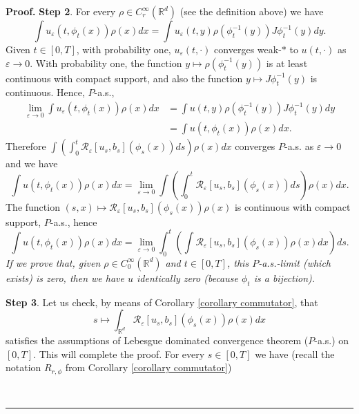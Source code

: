 \documentclass[a4paper,10pt]{article}
\newenvironment{proof}[1][Proof]{\textbf{#1.} }{\ \rule{0.5em}{0.5em}}
\begin{document}
\begin{proof}
\vskip 2mm \textbf{Step 2}. For every $\rho\in
C_{r}^{\infty}({}{\mathbb{R}}^{d})$ (see the definition above) we
have
\[
\int u_{{\varepsilon}}(t,{\phi}_{t}(x))\rho\left(  x\right)  dx=\int
u_{{\varepsilon}}(t,{y})\rho\left(  {\phi}_{t}^{-1}(y)\right)  J{\phi}%
_{t}^{-1}(y)dy.
\]
Given $t\in\left[  0,T\right]  $, with probability one, $u_{{\varepsilon}%
}(t,{\cdot})$ converges weak-$*$  to $u(t,{\cdot})$ as $\varepsilon
\rightarrow0$. With probability one, the function $y\mapsto\rho(  {\phi
}_{t}^{-1}(y))  $ is at least continuous with compact support, and also
the function $y\mapsto J{\phi}_{t}^{-1}(y)$ is continuous. Hence, $P$-a.s.,
\begin{align*}
\lim_{\varepsilon\rightarrow0}\int u_{{\varepsilon}}(t,{\phi}_{t}%
(x))\rho\left(  x\right)  dx  &  =\int u(t,{y})\rho\left(  {\phi}_{t}%
^{-1}(y)\right)  J{\phi}_{t}^{-1}(y)dy\\
&  =\int u(t,{\phi}_{t}(x))\rho\left(  x\right)  dx.
\end{align*}
Therefore $\int\left(  \int_{0}^{t}\mathcal{R}_{\varepsilon}\left[
u_{s},b_{s}\right]  \left(  {\phi}_{s}(x)\right)  ds\right)  \rho\left(
x\right)  dx$ converges $P$-a.s. as $\varepsilon\rightarrow0$ and we have
\[
\int u(t,{\phi}_{t}(x))\rho\left(  x\right)  dx=\lim_{\varepsilon\rightarrow
0}\int\left(  \int_{0}^{t}\mathcal{R}_{\varepsilon}\left[  u_{s},b_{s}\right]
\left(  {\phi}_{s}(x)\right)  ds\right)  \rho\left(  x\right)  dx.
\]
The function $\left(  s,x\right)  \mapsto\mathcal{R}_{\varepsilon}\left[
u_{s},b_{s}\right]  \left(  {\phi}_{s}(x)\right)  \rho\left(  x\right)  $ is
continuous with compact support, $P$-a.s., hence
\[
\int u(t,{\phi}_{t}(x))\rho\left(  x\right)  dx=\lim_{\varepsilon\rightarrow
0}\int_{0}^{t}\left(  \int\mathcal{R}_{\varepsilon}\left[  u_{s},b_{s}\right]
\left(  {\phi}_{s}(x)\right)  \rho\left(  x\right)  dx\right)  ds.
\]
{\it If we prove that, given $\rho\in
C_{0}^{\infty}({}{\mathbb{R}}^{d})$ and $t\in\left[  0,T\right] $,
this $P$-a.s.-limit (which exists) is zero, then we have $u$
identically zero (because ${\phi}_{t}$ is a bijection).
}

\vskip 2mm \textbf{Step 3}. Let us check, by means of Corollary
\ref{corollary commutator}, that $$ s\mapsto\int_{\mathbb{R} ^d}
\mathcal{R}_{\varepsilon}\left[  u_{s} ,b_{s}\right] \left(
{\phi}_{s}(x)\right)  \rho\left(  x\right) dx
$$ satisfies
the assumptions of Lebesgue dominated convergence theorem
($P$-a.s.) on $[0,T]$.
 This will complete
the proof. For every $s\in\left[  0,T\right]  $ we have (recall
the notation $R_{r,{\phi }}$ from Corollary \ref{corollary
commutator})




\end{proof}
\end{document}
